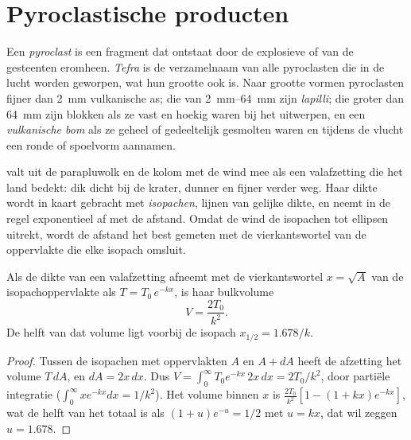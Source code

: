\section{Pyroclastische producten}

\begin{definition}\label{def:b2:eruptive-styles:tephra}
Een \emph{pyroclast} is een fragment dat ontstaat door de explosieve
 of van de gesteenten eromheen. \emph{Tefra} is
de verzamelnaam van alle pyroclasten die in de lucht worden geworpen, wat hun grootte ook is.
Naar grootte vormen pyroclasten fijner dan \qty{2}{mm} vulkanische as; die van
\qtyrange{2}{64}{mm} zijn \emph{lapilli}; die groter dan
\qty{64}{mm} zijn blokken als ze vast en hoekig waren bij het uitwerpen, en een
\emph{vulkanische bom} als ze geheel of gedeeltelijk gesmolten waren
en tijdens de vlucht een ronde of spoelvorm aannamen.
\end{definition}

 valt uit de parapluwolk en de kolom met de wind mee als een valafzetting
die het land bedekt: dik dicht bij de krater, dunner en fijner verder weg. Haar
dikte wordt in kaart gebracht met \emph{isopachen}, lijnen van gelijke dikte, en neemt in de regel
exponentieel af met de afstand. Omdat de wind de isopachen
tot ellipsen uitrekt, wordt de afstand het best gemeten met de vierkantswortel van de oppervlakte die elke
isopach omsluit.

\begin{proposition}\label{prop:b2:eruptive-styles:thinning}
Als de dikte van een valafzetting afneemt met de vierkantswortel $x = \sqrt A$
van de isopachoppervlakte als $T = T_0\,e^{-kx}$, is haar bulkvolume
\[
V = \frac{2T_0}{k^2}.
\]
De helft van dat volume ligt voorbij de isopach $x_{1/2} = 1.678/k$.
\end{proposition}

\begin{proof}
Tussen de isopachen met oppervlakten $A$ en $A + dA$ heeft de afzetting het volume $T\,dA$,
en $dA = 2x\,dx$. Dus $V = \int_0^\infty T_0e^{-kx}\,2x\,dx = 2T_0/k^2$, door
partiële integratie ($\int_0^\infty xe^{-kx}dx = 1/k^2$). Het volume binnen $x$
is $\frac{2T_0}{k^2}[1 - (1 + kx)e^{-kx}]$, wat de helft van het totaal is als $(1 +
u)e^{-u} = 1/2$ met $u = kx$, dat wil zeggen $u = 1.678$.
\end{proof}

